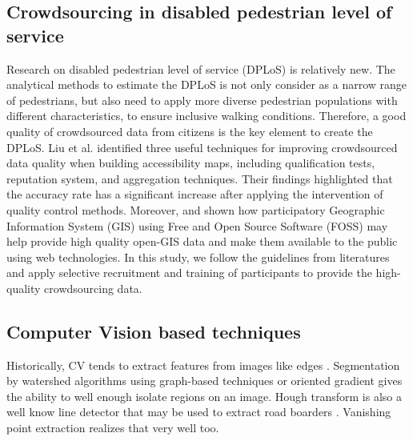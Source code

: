 \documentclass[10pt,conference,a4paper]{IEEEtran}
\begin{document}
\subsection{Crowdsourcing in disabled pedestrian level of service}
Research on disabled pedestrian level of service (DPLoS) is relatively new. The analytical methods to estimate the DPLoS is not only consider as a narrow range of pedestrians, but also need to apply more diverse pedestrian populations with different characteristics, to ensure inclusive walking conditions. Therefore, a good quality of crowdsourced data from citizens is the key element to create the DPLoS. Liu et al. \cite{liu2018} identified three useful techniques for improving crowdsourced data quality when building accessibility maps, including qualification tests, reputation system, and aggregation techniques. Their findings highlighted that the accuracy rate has a significant increase after applying the intervention of quality control methods. Moreover, \cite{brovelli_webbased_2014} and \cite{minghini_multi-dimensional_2014} shown how participatory Geographic Information System (GIS) using Free and Open Source Software (FOSS) may help provide high quality open-GIS data and make them available to the public using web technologies. In this study, we follow the guidelines from literatures and apply selective recruitment and training of participants to provide the high-quality crowdsourcing data.


\subsection{Computer Vision based techniques}
Historically, CV tends to extract features from images like edges \cite{canny_computational_1986}.
Segmentation by watershed algorithms \cite{beucher_road_1990,meyer_morphological_1990, beucher_segmentation:_1993} using graph-based techniques \cite{felzenszwalb_efficient_2004} or oriented gradient \cite{malisiewicz_ensemble_2011} gives the ability to well enough isolate regions on an image.
Hough transform is also a well know line detector that may be used to extract road boarders \cite{duda_use_1972,illingworth_survey_1988,ballard_generalizing_1981,kiryati_probabilistic_1991,yu1997,aly2008real}. Vanishing point extraction \cite{se_road_2003,wang2004lane,kong2009vanishing} realizes that very well too.
\end{document}
